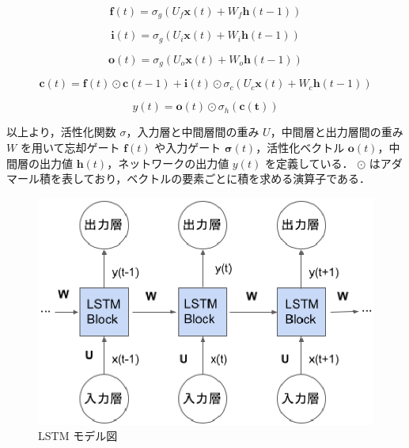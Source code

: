 \documentclass[twocolumn,fleqn,10pt]{jarticle}
\begin{document}
\vspace{-4mm}
\begin{equation}
    \bm{f}(t) = σ_g(U_f\bm{x}(t) + W_f\bm{h}(t - 1))
\end{equation}



\vspace{-4mm}
\begin{equation}
    \bm{i}(t) = σ_g(U_i\bm{x}(t) + W_i\bm{h}(t - 1))
\end{equation}



\vspace{-4mm}
\begin{equation}
    \bm{o}(t) = σ_g(U_o\bm{x}(t) + W_o\bm{h}(t - 1))
\end{equation}



\vspace{-4mm}
\begin{equation}
    \bm{c}(t) = \bm{f}(t)\odot \bm{c}(t - 1) + \bm{i}(t)\odot σ_c(U_c\bm{x}(t) + W_c\bm{h}(t - 1))
\end{equation} %



\vspace{-8mm}
\begin{equation}
    y(t) = \bm{o}(t) \odot σ_h(\bm{c(t)})
\end{equation}



以上より，活性化関数 $σ$，入力層と中間層間の重み $U$，中間層と出力層間の重み $W$ を用いて忘却ゲート $\bm{f}(t)$ や入力ゲート $\bm{σ}(t)$，活性化ベクトル $\bm{o}(t)$，中間層の出力値 $\bm{h}(t)$，ネットワークの出力値 $y(t)$ を定義している．
$\odot$ はアダマール積を表しており，ベクトルの要素ごとに積を求める演算子である．




\begin{figure}[b]
  \includegraphics[width=\linewidth]{fig/chap2/LSTM.eps}
  \caption{LSTM モデル図}
  \label{fig:lstm}
\end{figure}
\vspace{7mm}
\end{document}
